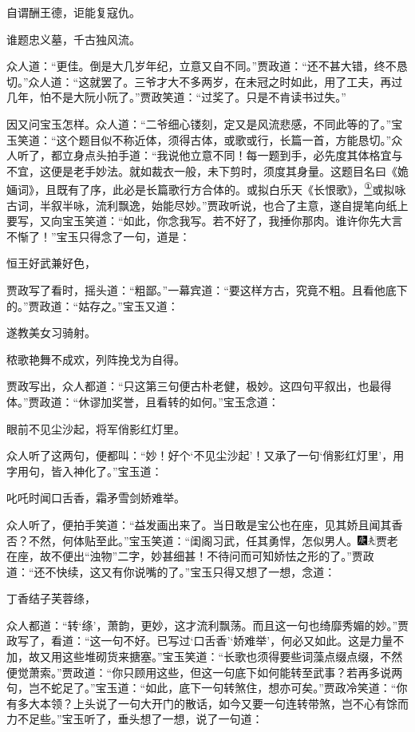自谓酬王德，讵能复寇仇。

谁题忠义墓，千古独风流。

众人道：``更佳。倒是大几岁年纪，立意又自不同。''贾政道：``还不甚大错，终不恳切。''众人道：``这就罢了。三爷才大不多两岁，在未冠之时如此，用了工夫，再过几年，怕不是大阮小阮了。''贾政笑道：``过奖了。只是不肯读书过失。''

因又问宝玉怎样。众人道：``二爷细心镂刻，定又是风流悲感，不同此等的了。''宝玉笑道：``这个题目似不称近体，须得古体，或歌或行，长篇一首，方能恳切。''众人听了，都立身点头拍手道：``我说他立意不同！每一题到手，必先度其体格宜与不宜，这便是老手妙法。就如裁衣一般，未下剪时，须度其身量。这题目名曰《姽婳词》，且既有了序，此必是长篇歌行方合体的。或拟白乐天《长恨歌》，\href{../Text/part0082_split_000.html\#lnkback_1_a}{\textsuperscript{①}}或拟咏古词，半叙半咏，流利飘逸，始能尽妙。''贾政听说，也合了主意，遂自提笔向纸上要写，又向宝玉笑道：``如此，你念我写。若不好了，我捶你那肉。谁许你先大言不惭了！''宝玉只得念了一句，道是：

恒王好武兼好色，

贾政写了看时，摇头道：``粗鄙。''一幕宾道：``要这样方古，究竟不粗。且看他底下的。''贾政道：``姑存之。''宝玉又道：

遂教美女习骑射。

秾歌艳舞不成欢，列阵挽戈为自得。

贾政写出，众人都道：``只这第三句便古朴老健，极妙。这四句平叙出，也最得体。''贾政道：``休谬加奖誉，且看转的如何。''宝玉念道：

眼前不见尘沙起，将军俏影红灯里。

众人听了这两句，便都叫：``妙！好个`不见尘沙起'！又承了一句`俏影红灯里'，用字用句，皆入神化了。''宝玉道：

叱吒时闻口舌香，霜矛雪剑娇难举。

众人听了，便拍手笑道：``益发画出来了。当日敢是宝公也在座，见其娇且闻其香否？不然，何体贴至此。''宝玉笑道：``闺阁习武，任其勇悍，怎似男人。{\includegraphics[width=3mm]{../Images/00004}\includegraphics[width=3mm]{../Images/00012}\footnotesize \kaishu 贾老在座，故不便出``浊物''二字，妙甚细甚！}不待问而可知娇怯之形的了。''贾政道：``还不快续，这又有你说嘴的了。''宝玉只得又想了一想，念道：

丁香结子芙蓉绦，

众人都道：``转`绦'，萧韵，更妙，这才流利飘荡。而且这一句也绮靡秀媚的妙。''贾政写了，看道：``这一句不好。已写过`口舌香'`娇难举'，何必又如此。这是力量不加，故又用这些堆砌货来搪塞。''宝玉笑道：``长歌也须得要些词藻点缀点缀，不然便觉萧索。''贾政道：``你只顾用这些，但这一句底下如何能转至武事？若再多说两句，岂不蛇足了。''宝玉道：``如此，底下一句转煞住，想亦可矣。''贾政冷笑道：``你有多大本领？上头说了一句大开门的散话，如今又要一句连转带煞，岂不心有馀而力不足些。''宝玉听了，垂头想了一想，说了一句道：

